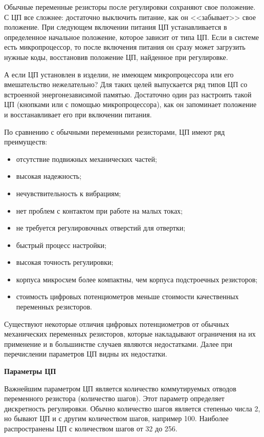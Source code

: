 Обычные переменные резисторы после регулировки сохраняют свое положение. С ЦП все сложнее: достаточно выключить питание, как он <<забывает>> свое положение. При следующем включении питания ЦП устанавливается в определенное начальное положение, которое зависит от типа ЦП. Если в системе есть микропроцессор, то после включения питания он сразу может загрузить нужные коды, восстановив положение ЦП, найденное при регулировке. 

А если ЦП установлен в изделии, не имеющем микропроцессора или его вмешательство нежелательно? Для таких целей выпускается ряд типов ЦП со встроенной энергонезависимой памятью. Достаточно один раз настроить такой ЦП (кнопками или с помощью микропроцессора), как он запоминает положение и восстанавливает его при включении питания.

По сравнению с обычными переменными резисторами, ЦП имеют ряд преимуществ:
\begin{itemize}
\item отсутствие подвижных механических частей; 
\item высокая надежность; 
\item нечувствительность к вибрациям; 
\item нет проблем с контактом при работе на малых токах; 
\item не требуется регулировочных отверстий для отвертки; 
\item быстрый процесс настройки; 
\item высокая точность регулировки; 
\item корпуса микросхем более компактны, чем корпуса подстроечных резисторов; 
\item стоимость цифровых потенциометров меньше стоимости качественных переменных резисторов. 
\end{itemize}

Существуют некоторые отличия цифровых потенциометров от обычных механических переменных резисторов, которые накладывают ограничения на их применение и в большинстве случаев являются недостатками. Далее при перечислении параметров ЦП видны их недостатки.

\begin{flushleft}
\textbf{Параметры ЦП}
\end{flushleft}

Важнейшим параметром ЦП является количество коммутируемых отводов переменного резистора (количество шагов). Этот параметр определяет дискретность регулировки. Обычно количество шагов является степенью числа 2, но бывают ЦП и с другим количеством шагов, например 100. Наиболее распространены ЦП с количеством шагов от 32 до 256. 

